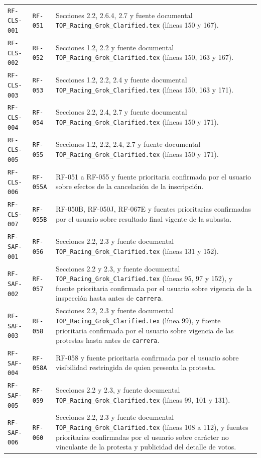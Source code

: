 \documentclass[10pt,letterpaper]{article}
\begin{document}
\begin{landscape}
\begin{longtable}{P{2.7cm}P{2.6cm}P{15.7cm}}
\texttt{RF-CLS-001} & \texttt{RF-051} & Secciones 2.2, 2.6.4, 2.7 y fuente documental \texttt{TOP\_Racing\_Grok\_Clarified.tex} (líneas 150 y 167).\\
\texttt{RF-CLS-002} & \texttt{RF-052} & Secciones 1.2, 2.2 y fuente documental \texttt{TOP\_Racing\_Grok\_Clarified.tex} (líneas 150, 163 y 167).\\
\texttt{RF-CLS-003} & \texttt{RF-053} & Secciones 1.2, 2.2, 2.4 y fuente documental \texttt{TOP\_Racing\_Grok\_Clarified.tex} (líneas 150, 163 y 171).\\
\texttt{RF-CLS-004} & \texttt{RF-054} & Secciones 2.2, 2.4, 2.7 y fuente documental \texttt{TOP\_Racing\_Grok\_Clarified.tex} (líneas 150 y 171).\\
\texttt{RF-CLS-005} & \texttt{RF-055} & Secciones 1.2, 2.2, 2.4, 2.7 y fuente documental \texttt{TOP\_Racing\_Grok\_Clarified.tex} (líneas 150 y 171).\\
\texttt{RF-CLS-006} & \texttt{RF-055A} & RF-051 a RF-055 y fuente prioritaria confirmada por el usuario sobre efectos de la cancelación de la inscripción.\\
\texttt{RF-CLS-007} & \texttt{RF-055B} & RF-050B, RF-050J, RF-067E y fuentes prioritarias confirmadas por el usuario sobre resultado final vigente de la subasta.\\
\texttt{RF-SAF-001} & \texttt{RF-056} & Secciones 2.2, 2.3 y fuente documental \texttt{TOP\_Racing\_Grok\_Clarified.tex} (líneas 131 y 152).\\
\texttt{RF-SAF-002} & \texttt{RF-057} & Secciones 2.2 y 2.3, y fuente documental \texttt{TOP\_Racing\_Grok\_Clarified.tex} (líneas 95, 97 y 152), y fuente prioritaria confirmada por el usuario sobre vigencia de la inspección hasta antes de \texttt{carrera}.\\
\texttt{RF-SAF-003} & \texttt{RF-058} & Secciones 2.2, 2.3 y fuente documental \texttt{TOP\_Racing\_Grok\_Clarified.tex} (línea 99), y fuente prioritaria confirmada por el usuario sobre vigencia de las protestas hasta antes de \texttt{carrera}.\\
\texttt{RF-SAF-004} & \texttt{RF-058A} & RF-058 y fuente prioritaria confirmada por el usuario sobre visibilidad restringida de quien presenta la protesta.\\
\texttt{RF-SAF-005} & \texttt{RF-059} & Secciones 2.2 y 2.3, y fuente documental \texttt{TOP\_Racing\_Grok\_Clarified.tex} (líneas 99, 101 y 131).\\
\texttt{RF-SAF-006} & \texttt{RF-060} & Secciones 2.2, 2.3 y fuente documental \texttt{TOP\_Racing\_Grok\_Clarified.tex} (líneas 108 a 112), y fuentes prioritarias confirmadas por el usuario sobre carácter no vinculante de la protesta y publicidad del detalle de votos.\\

\end{longtable}
\end{landscape}
\end{document}
